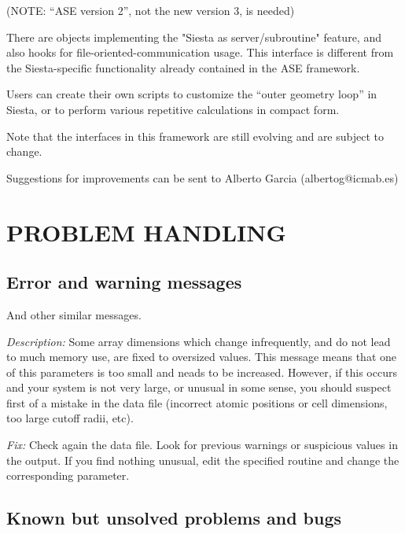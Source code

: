 \documentclass[11pt]{article}
\begin{document}
(NOTE: ``ASE version 2'', not the new version 3, is needed)

There are objects implementing the "Siesta as server/subroutine" feature, and
also hooks for file-oriented-communication usage. This interface is
different from the {\sc Siesta}-specific functionality already
contained in the ASE framework.

Users can create their own scripts to customize the ``outer geometry loop''
in Siesta, or to perform various repetitive calculations in compact form.

Note that the interfaces in this framework are still evolving and are
subject to change.

Suggestions for improvements can be sent to Alberto Garcia
(albertog@icmab.es)

\section{PROBLEM HANDLING}

\subsection{Error and warning messages}

\begin{description}
\itemsep 10pt
\parsep 0pt

\item[{\tt chkdim: ERROR: In {\it routine} dimension {\it parameter} =
{\it value}. It must be  ...}]

And other similar messages.

{\it Description:} Some array dimensions which change infrequently,
and do not lead to much memory use, are fixed to oversized
values. This message means that one of this parameters is too small
and neads to be increased.  However, if this occurs and your system is
not very large, or unusual in some sense, you should suspect first of
a mistake in the data file (incorrect atomic positions or cell
dimensions, too large cutoff radii, etc).

{\it Fix:} Check again the data file.  Look for previous warnings or
suspicious values in the output.  If you find nothing unusual, edit
the specified routine and change the corresponding parameter.  

\end{description}



\subsection{Known but unsolved problems and bugs}
\end{document}
